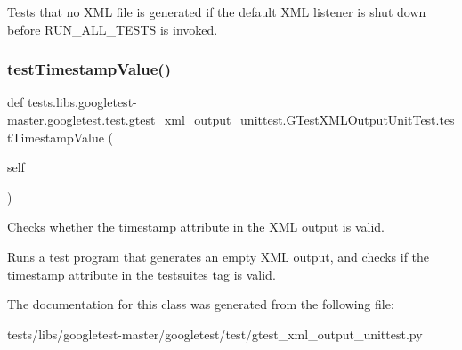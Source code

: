 \begin{DoxyVerb}Tests that no XML file is generated if the default XML listener is
shut down before RUN_ALL_TESTS is invoked.
\end{DoxyVerb}
 \mbox{\label{classtests_1_1libs_1_1googletest-master_1_1googletest_1_1test_1_1gtest__xml__output__unittest_1_1GTestXMLOutputUnitTest_a117132e57694d1ec1c170ff2224ff594}} 
\subsubsection{\texorpdfstring{test\+Timestamp\+Value()}{testTimestampValue()}}
{\footnotesize\ttfamily def tests.\+libs.\+googletest-\/master.\+googletest.\+test.\+gtest\+\_\+xml\+\_\+output\+\_\+unittest.\+G\+Test\+X\+M\+L\+Output\+Unit\+Test.\+test\+Timestamp\+Value (\begin{DoxyParamCaption}\item[{}]{self }\end{DoxyParamCaption})}

\begin{DoxyVerb}Checks whether the timestamp attribute in the XML output is valid.

Runs a test program that generates an empty XML output, and checks if
the timestamp attribute in the testsuites tag is valid.
\end{DoxyVerb}
 

The documentation for this class was generated from the following file\+:\begin{DoxyCompactItemize}
\item 
tests/libs/googletest-\/master/googletest/test/gtest\+\_\+xml\+\_\+output\+\_\+unittest.\+py\end{DoxyCompactItemize}
